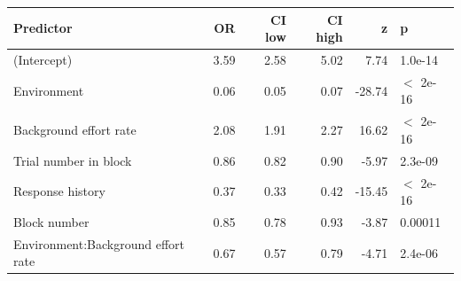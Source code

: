 \begin{table}[ht]
\centering
\begin{tabular}{lrrrrl}
  \hline
Predictor & OR & CI low & CI high & z & p \\ 
  \hline
(Intercept) & 3.59 & 2.58 & 5.02 & 7.74 & 1.0e-14 \\ 
  Environment & 0.06 & 0.05 & 0.07 & -28.74 & $<$ 2e-16 \\ 
  Background effort rate & 2.08 & 1.91 & 2.27 & 16.62 & $<$ 2e-16 \\ 
  Trial number in block & 0.86 & 0.82 & 0.90 & -5.97 & 2.3e-09 \\ 
  Response history & 0.37 & 0.33 & 0.42 & -15.45 & $<$ 2e-16 \\ 
  Block number & 0.85 & 0.78 & 0.93 & -3.87 & 0.00011 \\ 
  Environment:Background effort rate & 0.67 & 0.57 & 0.79 & -4.71 & 2.4e-06 \\ 
   \hline
\end{tabular}
\end{table}
